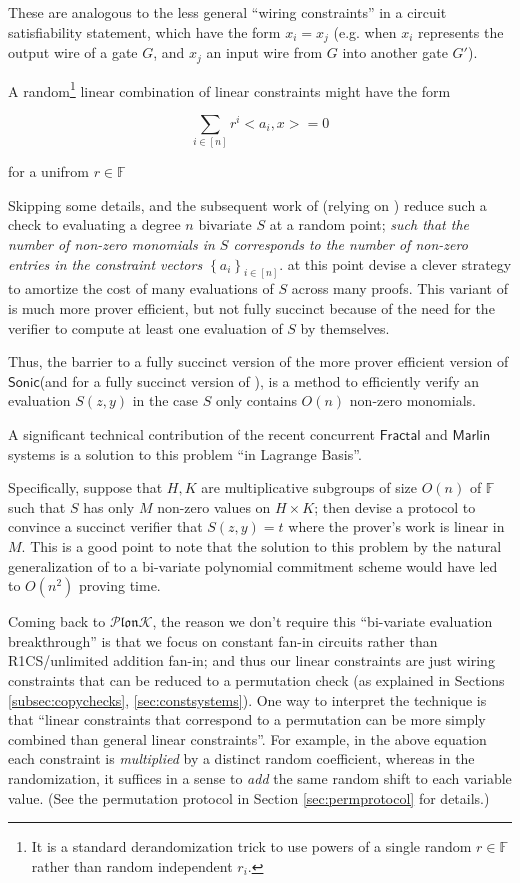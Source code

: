 \documentclass[11pt]{article} %
\newcommand{\plonk}{\ensuremath{\mathcal{P} \mathfrak{lon}\mathcal{K}}\xspace}
\newcommand{\F}{\ensuremath{\mathbb F}\xspace}
\newcommand{\sett}[2]{\ensuremath{\set{#1}_{#2}}\xspace}
\newcommand{\sonic}{\ensuremath{\mathsf{Sonic}}\xspace}
\newcommand{\set}[1]{\ensuremath{\left\{#1\right\}}\xspace}
\newcommand{\marlin}{\ensuremath{\mathsf{Marlin}}\xspace}
\newcommand{\fractal}{\ensuremath{\mathsf{Fractal}}\xspace}
\begin{document}
These are analogous to the less general ``wiring constraints'' in a circuit satisfiability statement, which
have the form $x_i=x_j$ (e.g. when $x_i$ represents the output wire of a gate $G$, and $x_j$ an input wire from $G$ into another gate $G'$).



A random\footnote{It is a standard derandomization trick to use powers of a single random $r\in \F$ rather than random independent $r_i$.} linear combination of linear constraints might have the form

\[\sum_{i\in [n]} r^i <a_i,x>=0 \]

for a unifrom $r\in \F$

Skipping some details, \cite{sonic} and the subsequent work of \cite{auroralight} (relying on \cite{aurora}) reduce such a check to evaluating a degree $n$ bivariate $S$ at a random point; \emph{such that the number of non-zero monomials in $S$ corresponds to the number of non-zero entries in the constraint vectors \sett{a_i}{i\in [n]}}.
\cite{sonic} at this point devise a clever strategy to amortize the cost of many evaluations of $S$ across many proofs.
This variant of \cite{sonic} is much more prover efficient, but not fully succinct because of the need for the verifier to compute at least one evaluation of $S$ by themselves.


Thus, the barrier to a fully succinct version of the more prover efficient version of \sonic (and for a fully succinct version of \cite{
auroralight}), is a method to efficiently verify an evaluation $S(z,y)$ in the case $S$ only contains $O(n)$ non-zero monomials.

A significant technical contribution of the recent concurrent \fractal and \marlin systems \cite{marlin,fractal}
is a solution to this problem ``in Lagrange Basis''.

Specifically, suppose that $H,K$ are multiplicative subgroups of size $O(n)$ of \F such that $S$ has only $M$ non-zero values on $H\times K$; then \cite{marlin,fractal} devise a protocol to convince a succinct verifier that $S(z,y)=t$ where the prover's work is linear in $M$. This is a good point to note that the solution to this problem by the natural generalization of \cite{kate} to a bi-variate polynomial commitment scheme would have led to $O(n^2)$ proving time.


Coming back to \plonk, the reason we don't require this ``bi-variate evaluation breakthrough'' is that we focus on constant fan-in circuits rather than R1CS/unlimited addition fan-in; and thus our linear constraints are just wiring constraints that can be reduced to a permutation check (as explained in Sections \ref{subsec:copychecks}, \ref{sec:constsystems}). One way to interpret the \cite{permorig} technique is that ``linear constraints that correspond to a permutation can be more simply combined than general linear constraints''. For example, in the above equation each constraint is \emph{multiplied} by a distinct random coefficient, whereas in the \cite{permorig} randomization, it suffices in a sense to \emph{add} the same random shift to each variable value. (See the permutation protocol in Section \ref{sec:permprotocol} for details.)
\end{document}
